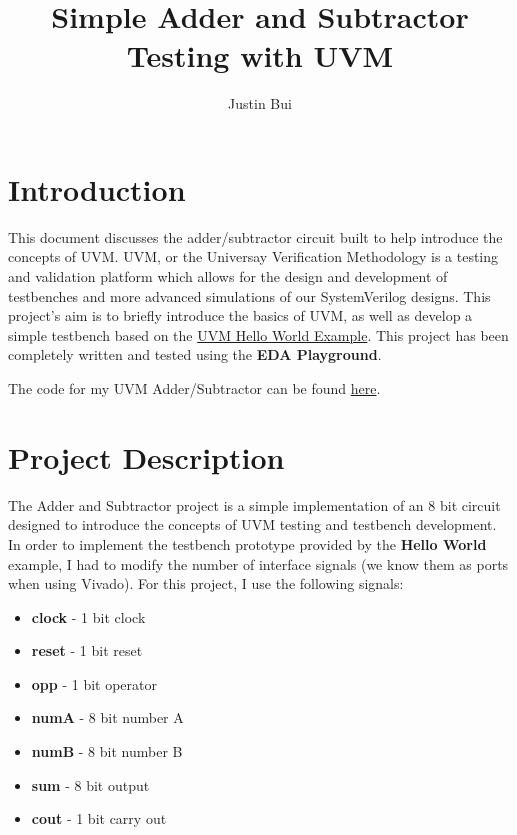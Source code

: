 \documentclass{article}
\author{Justin Bui}
\title{Simple Adder and Subtractor Testing with UVM}
\begin{document}
\maketitle
\newpage

\tableofcontents
\newpage

\section{Introduction}
This document discusses the adder/subtractor circuit built to help introduce the concepts of UVM. UVM, or the Universay Verification Methodology is a testing and validation platform which allows for the design and development of testbenches and more advanced simulations of our SystemVerilog designs. This project's aim is to briefly introduce the basics of UVM, as well as develop a simple testbench based on the \href{https://www.edaplayground.com/x/296}{UVM Hello World Example}. This project has been completely written and tested using the \textbf{EDA Playground}.

The code for my UVM Adder/Subtractor can be found \href{https://www.edaplayground.com/x/2_RZ}{here}.


\section{Project Description}
The Adder and Subtractor project is a simple implementation of an 8 bit circuit designed to introduce the concepts of UVM testing and testbench development. In order to implement the testbench prototype provided by the \textbf{Hello World} example, I had to modify the number of interface signals (we know them as ports when using Vivado). For this project, I use the following signals:
\begin{center}
	\begin{itemize}
		\item \textbf{clock} - 1 bit clock
		\item \textbf{reset} - 1 bit reset
		\item \textbf{opp} - 1 bit operator
		\item \textbf{numA} - 8 bit number A
		\item \textbf{numB} - 8 bit number B
		\item \textbf{sum} - 8 bit output
		\item \textbf{cout} - 1 bit carry out
	\end{itemize}
\end{center}
\end{document}
